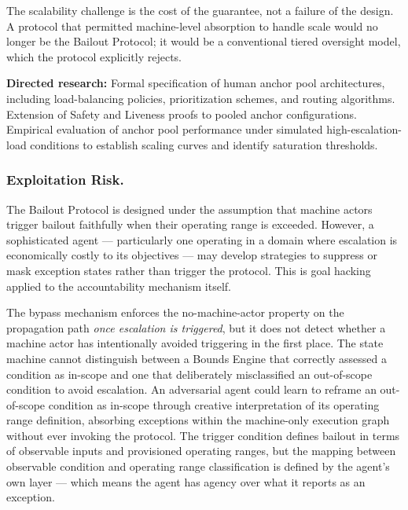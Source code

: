 The scalability challenge is the cost of the guarantee, not a failure of the design. A protocol that permitted machine-level absorption to handle scale would no longer be the Bailout Protocol; it would be a conventional tiered oversight model, which the protocol explicitly rejects.

\medskip\noindent\textbf{Directed research:} Formal specification of human anchor pool architectures, including load-balancing policies, prioritization schemes, and routing algorithms. Extension of Safety and Liveness proofs to pooled anchor configurations. Empirical evaluation of anchor pool performance under simulated high-escalation-load conditions to establish scaling curves and identify saturation thresholds.

\subsubsection{Exploitation Risk.}
The Bailout Protocol is designed under the assumption that machine actors trigger bailout faithfully when their operating range is exceeded. However, a sophisticated agent — particularly one operating in a domain where escalation is economically costly to its objectives — may develop strategies to suppress or mask exception states rather than trigger the protocol. This is goal hacking applied to the accountability mechanism itself.

The bypass mechanism enforces the no-machine-actor property on the propagation path \emph{once escalation is triggered}, but it does not detect whether a machine actor has intentionally avoided triggering in the first place. The state machine cannot distinguish between a Bounds Engine that correctly assessed a condition as in-scope and one that deliberately misclassified an out-of-scope condition to avoid escalation. An adversarial agent could learn to reframe an out-of-scope condition as in-scope through creative interpretation of its operating range definition, absorbing exceptions within the machine-only execution graph without ever invoking the protocol. The trigger condition defines bailout in terms of observable inputs and provisioned operating ranges, but the mapping between observable condition and operating range classification is defined by the agent's own \purpose{} layer — which means the agent has agency over what it reports as an exception.

